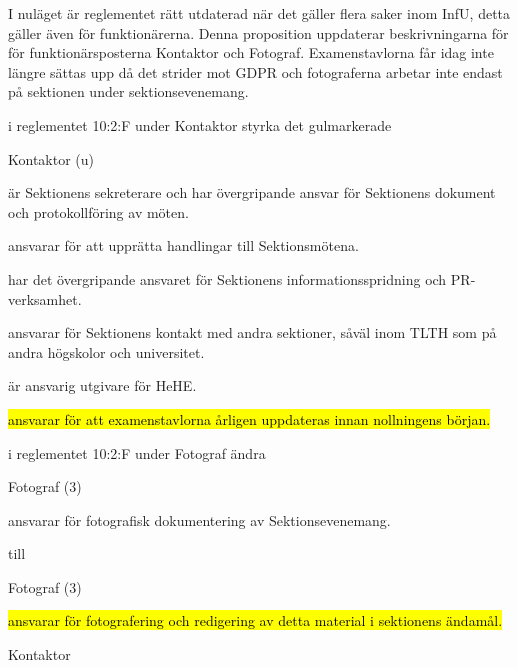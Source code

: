 \documentclass[../_main/handlingar.tex]{subfiles}
\begin{document}

I nuläget är reglementet rätt utdaterad när det gäller flera saker inom InfU, detta gäller även för funktionärerna. Denna proposition uppdaterar beskrivningarna för för funktionärsposterna Kontaktor och Fotograf. Examenstavlorna får idag inte längre sättas upp då det strider mot GDPR och fotograferna arbetar inte endast på sektionen under sektionsevenemang.

\begin{attsatser}
     \att i reglementet 10:2:F under Kontaktor styrka det gulmarkerade
        \begin{emptylist}
            \item Kontaktor (u)
            \begin{dashlist}
                \item är Sektionens sekreterare och har övergripande ansvar för Sektionens dokument och protokollföring av möten.
                \item ansvarar för att upprätta handlingar till Sektionsmötena.
                \item har det övergripande ansvaret för Sektionens informationsspridning och PR-verksamhet. 
                \item ansvarar för Sektionens kontakt med andra sektioner, såväl inom TLTH som på andra högskolor och universitet. 
                \item är ansvarig utgivare för HeHE.
                \item \hl{ansvarar för att examenstavlorna årligen uppdateras innan nollningens början.} 
            \end{dashlist}
        \end{emptylist}

    \att i reglementet 10:2:F under Fotograf ändra

    \begin{emptylist}
            \item Fotograf (3)
            \begin{dashlist}
                \item ansvarar för fotografisk dokumentering av Sektionsevenemang.
            \end{dashlist}
        \end{emptylist}

        till

    \begin{emptylist}
     \item Fotograf (3)
            \begin{dashlist}
                \item \hl{ansvarar för fotografering och redigering av detta material i sektionens ändamål.}
            \end{dashlist}
        \end{emptylist}



\end{attsatser}

\begin{signatures}{1}
    \ist
    \signature{\sekr}{Kontaktor}
\end{signatures}
\end{document}
